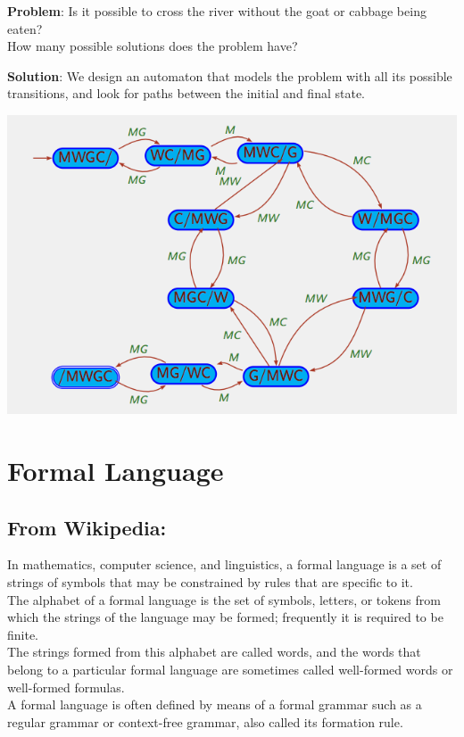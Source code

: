 \noindent
{\color{magenta} \textbf{Problem}:} Is it possible to cross the river
without the goat or cabbage being eaten?\\
How many possible solutions does the problem have?\\
\smallskip

\noindent
{\color{magenta} \textbf{Solution}:} We design an automaton that models the problem
with all its possible transitions, and look for paths between the initial
and final state.
\begin{center}
	\includegraphics[scale=0.5]{boatRide.png}
\end{center}

\section{Formal Language}
\label{sec:Formal Language}

\subsection{From Wikipedia:}
\label{sub:From Wikipedia:}

In mathematics, computer science, and linguistics,
a formal language is a set of strings of symbols that may
be constrained by rules that are specific to it.\\
The alphabet of a formal language is the set of symbols,
letters, or tokens from which the strings of the language may be formed;
frequently it is required to be finite.\\
The strings formed from this alphabet are called words,
and the words that belong to a particular formal language
are sometimes called well-formed words or well-formed formulas.\\
A formal language is often defined by means of a formal
grammar such as a regular grammar or context-free grammar,
also called its formation rule.

